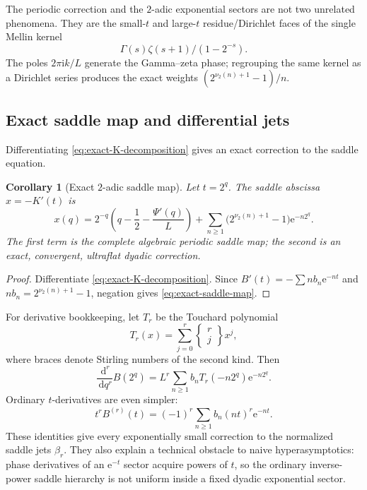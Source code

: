 \documentclass[11pt,oneside]{article}
\numberwithin{equation}{section}
\newtheorem{corollary}[theorem]{Corollary}
\theoremstyle{definition}
\theoremstyle{remark}
\newcommand{\e}{\mathrm e}
\newcommand{\ii}{\mathrm i}
\newcommand{\dd}{\,\mathrm d}
\newcommand{\vTwo}{\nu_2}
\begin{document}
\begin{resultbox}
The periodic correction and the $2$-adic exponential sectors are not two
unrelated phenomena.  They are the small-$t$ and large-$t$ residue/Dirichlet
faces of the single Mellin kernel
\[
 \Gamma(s)\zeta(s+1)/(1-2^{-s}).
\]
The poles $2\pi\ii k/L$ generate the Gamma--zeta phase; regrouping the same
kernel as a Dirichlet series produces the exact weights
$(2^{\vTwo(n)+1}-1)/n$.
\end{resultbox}

\subsection{Exact saddle map and differential jets}

Differentiating \eqref{eq:exact-K-decomposition} gives an exact correction to
the saddle equation.

\begin{corollary}[Exact $2$-adic saddle map]
\label{cor:exact-saddle-map}
Let $t=2^q$.  The saddle abscissa $x=-K'(t)$ is
\begin{equation}
\boxed{
 x(q)=2^{-q}\left(q-\frac12-\frac{\Psi'(q)}L\right)
 +\sum_{n\ge1}\bigl(2^{\vTwo(n)+1}-1\bigr)\e^{-n2^q}.}
 \label{eq:exact-saddle-map}
\end{equation}
The first term is the complete algebraic periodic saddle map; the second is an
exact, convergent, ultraflat dyadic correction.
\end{corollary}

\begin{proof}
Differentiate \eqref{eq:exact-K-decomposition}.  Since
$B'(t)=-\sum n b_n\e^{-nt}$ and $nb_n=2^{\vTwo(n)+1}-1$, negation gives
\eqref{eq:exact-saddle-map}.
\end{proof}

For derivative bookkeeping, let $T_r$ be the Touchard polynomial
\begin{equation}
 T_r(x)=\sum_{j=0}^r\left\{\begin{matrix}r\\j\end{matrix}\right\}x^j,
 \label{eq:Touchard}
\end{equation}
where braces denote Stirling numbers of the second kind.  Then
\begin{equation}
 \frac{\dd^r}{\dd q^r}B(2^q)
 =L^r\sum_{n\ge1}b_nT_r(-n2^q)\e^{-n2^q}.
 \label{eq:B-Touchard}
\end{equation}
Ordinary $t$-derivatives are even simpler:
\begin{equation}
 t^rB^{(r)}(t)=(-1)^r\sum_{n\ge1}b_n(nt)^r\e^{-nt}.
 \label{eq:B-ordinary-jets}
\end{equation}
These identities give every exponentially small correction to the normalized
saddle jets $\beta_r$.  They also explain a technical obstacle to naive
hyperasymptotics: phase derivatives of an $\e^{-t}$ sector acquire powers of
$t$, so the ordinary inverse-power saddle hierarchy is not uniform inside a
fixed dyadic exponential sector.
\end{document}
